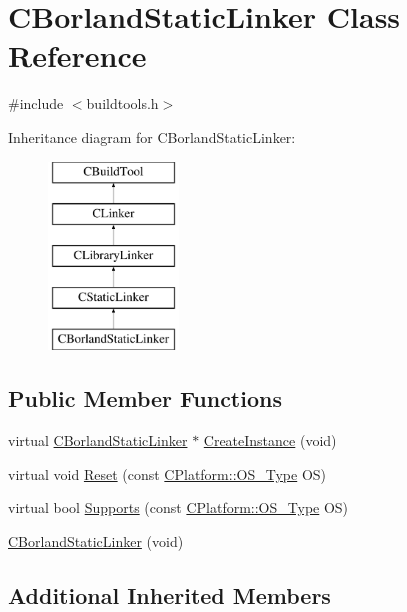 \hypertarget{classCBorlandStaticLinker}{\section{C\-Borland\-Static\-Linker Class Reference}
\label{classCBorlandStaticLinker}
}


{\ttfamily \#include $<$buildtools.\-h$>$}

Inheritance diagram for C\-Borland\-Static\-Linker\-:\begin{figure}[H]
\begin{center}
\leavevmode
\includegraphics[height=5.000000cm]{d4/d47/classCBorlandStaticLinker}
\end{center}
\end{figure}
\subsection*{Public Member Functions}
\begin{DoxyCompactItemize}
\item 
virtual \hyperlink{classCBorlandStaticLinker}{C\-Borland\-Static\-Linker} $\ast$ \hyperlink{classCBorlandStaticLinker_ac5c637b9e4762cf272d8710be8212857}{Create\-Instance} (void)
\item 
virtual void \hyperlink{classCBorlandStaticLinker_a179338b382e0a92ccc927666c52cdf18}{Reset} (const \hyperlink{classCPlatform_a2fb735c63c53052f79629e338bb0f535}{C\-Platform\-::\-O\-S\-\_\-\-Type} O\-S)
\item 
virtual bool \hyperlink{classCBorlandStaticLinker_ad2a9e9d8203c34246ca26641fb2e941b}{Supports} (const \hyperlink{classCPlatform_a2fb735c63c53052f79629e338bb0f535}{C\-Platform\-::\-O\-S\-\_\-\-Type} O\-S)
\item 
\hyperlink{classCBorlandStaticLinker_ad22e05578c8a79007ba36b43ea29755a}{C\-Borland\-Static\-Linker} (void)
\end{DoxyCompactItemize}
\subsection*{Additional Inherited Members}


